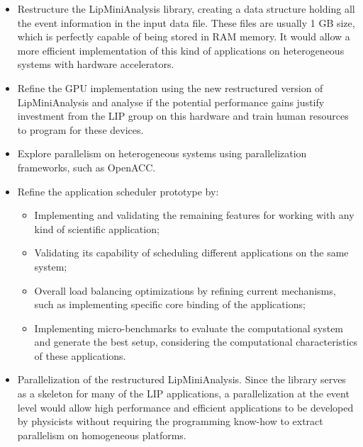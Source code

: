 \begin{itemize}
	\item Restructure the LipMiniAnalysis library, creating a data structure holding all the event information in the input data file. These files are usually 1 GB size, which is perfectly capable of being stored in RAM memory. It would allow a more efficient implementation of this kind of applications on heterogeneous systems with hardware accelerators.
	\item Refine the GPU implementation using the new restructured version of LipMiniAnalysis and analyse if the potential performance gains justify investment from the LIP group on this hardware and train human resources to program for these devices.
	\item Explore parallelism on heterogeneous systems using parallelization frameworks, such as OpenACC.
	\item Refine the application scheduler prototype by:
	\begin{itemize}
		\item Implementing and validating the remaining features for working with any kind of scientific application;
		\item Validating its capability of scheduling different applications on the same system;
		\item Overall load balancing optimizations by refining current mechanisms, such as implementing specific core binding of the applications;
		\item Implementing micro-benchmarks to evaluate the computational system and generate the best setup, considering the computational characteristics of these applications.
	\end{itemize}
	\item Parallelization of the restructured LipMiniAnalysis. Since the library serves as a skeleton for many of the LIP applications, a parallelization at the event level would allow high performance and efficient applications to be developed by physicists without requiring the programming know-how to extract parallelism on homogeneous platforms.
\end{itemize}
